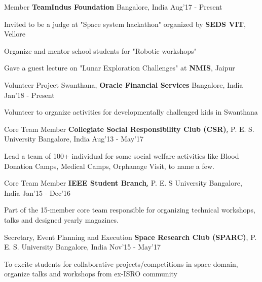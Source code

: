 \begin{cventries}
	\cventry
	{Member}
	{\textbf{TeamIndus Foundation}}
	{Bangalore, India}
	{Aug'17 - Present}
	{
		\begin{cvitems}
		\item{Invited to be a judge at "Space system hackathon" organized by \textbf{SEDS VIT}, Vellore}
		\item{Organize and mentor school students for "Robotic workshops"}
		\item{Gave a guest lecture on "Lunar Exploration Challenges" at \textbf{NMIS}, Jaipur}
		\end{cvitems}
	}
	\cventry
	{Volunteer}
	{Project Swanthana, \textbf{Oracle Financial Services}}
	{Bangalore, India}
	{Jan'18 - Present}
	{
		\begin{cvitems}
		\item{Volunteer to organize activities for developmentally challenged kids in Swanthana}
		\end{cvitems}
	}

	\cventry
	{Core Team Member}
	{\textbf{Collegiate Social Responsibility Club (CSR)}\href{http://pes.edu/clubs/pes-csr-club/}, P. E. S. University}
	{Bangalore, India}
	{Aug'13 - May'17}
	{
		\begin{cvitems}
		\item{Lead a team of 100+ individual for some social welfare activities like Blood Donation Camps, Medical Camps, Orphanage Visit, to name a few.}
		\end{cvitems}
	}

	\cventry
	{Core Team Member}
	{\textbf{IEEE Student Branch}\href{http://ieee.pes.edu/}, P. E. S University}
	{Bangalore, India}
	{Jan'15 - Dec'16}
	{
		\begin{cvitems}
		\item{Part of the 15-member core team responsible for organizing technical workshops, talks and designed yearly magazines.}
		\end{cvitems}
	}

	\cventry
	{Secretary, Event Planning and Execution}
	{\textbf{Space Research Club (SPARC)}\href{https://www.facebook.com/Space-Research-Club-Of-PES-University-487153011445398/?tn-str=k*F}, P. E. S. University}
	{Bangalore, India}
	{Nov'15 - May'17}
	{
		\begin{cvitems}
		\item{To excite students for collaborative projects/competitions in space domain, organize talks and workshops from ex-ISRO community}
		\end{cvitems}
	}


\end{cventries}
